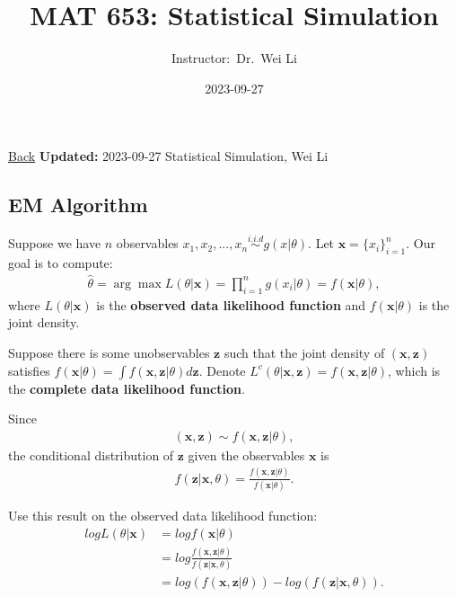 \documentclass[
  14pt,
]{article}
\title{MAT 653: Statistical Simulation}
\author{Instructor\(:\) Dr.~Wei Li}
\date{2023-09-27}
\begin{document}
\maketitle

{ { \href{javascript:window.history.back()}{Back} } { \textbf{Updated:}
2023-09-27 } { Statistical Simulation, Wei Li } }

\hypertarget{em-algorithm}{%
\subsection{EM Algorithm}\label{em-algorithm}}

Suppose we have \(n\) observables
\(x_{1},x_{2},...,x_{n} \stackrel{i.i.d}{\sim} g(x|\theta)\). Let
\(\boldsymbol{x}=\{x_i\}_{i=1}^n\). Our goal is to compute:
\begin{align*}
  \hat{\theta} = \arg\max L(\theta | \boldsymbol{x}) = \prod^{n}_{i=1} g(x_{i} | \theta)= f(\boldsymbol{x}|\theta),
\end{align*} where \(L(\theta | \boldsymbol{x})\) is the
\textbf{observed data likelihood function} and
\(f(\boldsymbol{x}|\theta)\) is the joint density.

Suppose there is some unobservables \(\boldsymbol{z}\) such that the
joint density of \((\boldsymbol{x} ,\boldsymbol{z})\) satisfies
\(f(\boldsymbol{x}|\theta)=\int f(\boldsymbol{x}, \boldsymbol{z}|\theta) d\boldsymbol{z}\).
Denote
\(L^{c}(\theta | \boldsymbol{x},\boldsymbol{z}) = f(\boldsymbol{x},\boldsymbol{z}|\theta)\),
which is the \textbf{complete data likelihood function}.

Since \begin{align*}
  (\boldsymbol{x},\boldsymbol{z}) \sim f(\boldsymbol{x},\boldsymbol{z}|\theta),
\end{align*} the conditional distribution of \(\boldsymbol{z}\) given
the observables \(\boldsymbol{x}\) is \begin{align*}
  f(\boldsymbol{z}|\boldsymbol{x},\theta) = \frac{f(\boldsymbol{x},\boldsymbol{z}|\theta)}{f(\boldsymbol{x}|\theta)}. 
\end{align*}

Use this result on the observed data likelihood function: \begin{align*}
  logL(\theta | \boldsymbol{x}) & = log f(\boldsymbol{x}|\theta) \\
                         & = log \frac{f(\boldsymbol{x},\boldsymbol{z}|\theta)}{f(\boldsymbol{z}|\boldsymbol{x},\theta)} \\
                         & = log(f(\boldsymbol{x},\boldsymbol{z}|\theta)) - log(f(\boldsymbol{z}| \boldsymbol{x},\theta)). 
\end{align*}
\end{document}
